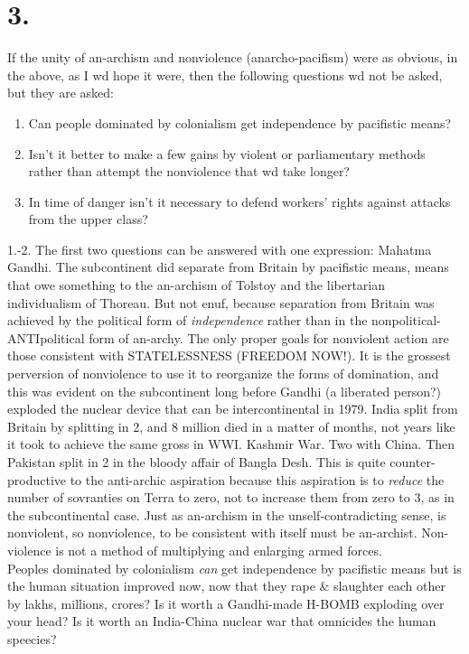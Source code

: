 \documentclass[12pt, onecolumn, letterpaper, oneside]{book}
\begin{document}
\section*{3.}
If the unity of an-archism and nonviolence (anarcho-pacifism) were as obvious, in the above, as I wd hope it were, then the following questions wd not be asked, but they are asked:
\begin{enumerate}
\item Can people dominated by colonialism get independence by pacifistic means?
\item Isn't it better to make a few gains by violent or parliamentary methods rather than attempt the nonviolence that wd take longer?
\item In time of danger isn't it necessary to defend workers' rights against attacks from the upper class?
\end{enumerate}
1.-2. The first two questions can be answered with one expression: Mahatma Gandhi. The subcontinent did separate from Britain by pacifistic means, means that owe something to the an-archism of Tolstoy and the libertarian individualism of Thoreau. But not enuf, because separation from Britain was achieved by the political form of \emph{independence} rather than in the nonpolitical-ANTIpolitical form of an-archy. The only proper goals for nonviolent action are those consistent with STATELESSNESS (FREEDOM NOW!). It is the grossest perversion of nonviolence to use it to reorganize the forms of domination, and this was evident on the subcontinent long before Gandhi (a liberated person?) exploded the nuclear device that can be intercontinental in 1979. India split from Britain by splitting in 2, and 8 million died in a matter of months, not years like it took to achieve the same gross in WWI. Kashmir War. Two with China. Then Pakistan split in 2 in the bloody affair of Bangla Desh. This is quite counter-productive to the anti-archic aspiration because this aspiration is to \emph{reduce} the number of sovranties on Terra to zero, not to increase them from zero to 3, as in the subcontinental case. Just as an-archism in the unself-contradicting sense, is nonviolent, so nonviolence, to be consistent with itself must be an-archist. Non-violence is not a method of multiplying and enlarging armed forces.\\
Peoples dominated by colonialism \emph{can} get independence by pacifistic means but is the human situation improved now, now that they rape \& slaughter each other by lakhs, millions, crores? Is it worth a Gandhi-made H-BOMB exploding over your head? Is it worth an India-China nuclear war that omnicides the human speecies?\\
\end{document}

